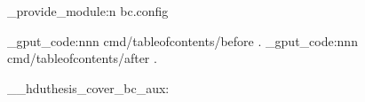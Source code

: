 \ExplSyntaxOn \makeatletter
\hduthesis_provide_module:n {bc.config}

\geometry { top = 3.25cm, bottom = 2.4cm, left = 4cm, right = 2cm,
            headheight = 15pt, headsep = .72cm }
\hook_gput_code:nnn {cmd/tableofcontents/before} { . }
  {
    \clearpage 
     \cfoot{\small \thepage}
  }
\hook_gput_code:nnn { cmd/tableofcontents/after } { . }
  {
    \thispagestyle{fancy} \clearpage
     \cfoot{}
  }

\RenewDocumentCommand \maketitle {}
  {
    \begin{titlepage}
      \__hduthesis_cover_bc_aux:
    \end{titlepage}
    \restoregeometry
  }

